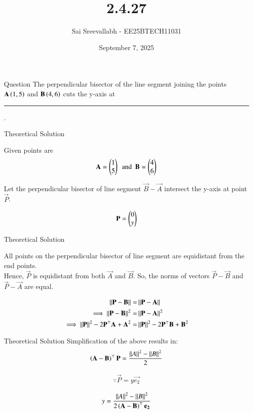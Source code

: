 \documentclass{beamer}
\title 
{2.4.27}
\date{September 7, 2025}
\author 
{Sai Sreevallabh - EE25BTECH11031}
\begin{document}
\frame{\titlepage}
\begin{frame}{Question}
The perpendicular bisector of the line segment joining the points $\mathbf{A}\left(1,5\right)$ and $\mathbf{B}\left(4,6\right)$ cuts the y-axis at \rule{1.5cm}{0.4pt}.
\end{frame}



\begin{frame}{Theoretical Solution}

Given points are\\

\begin{align}
    \mathbf{A}= \begin{pmatrix}1\\5\end{pmatrix} \ \ \text{and}\ \ \mathbf{B} = \begin{pmatrix}4\\6\end{pmatrix}
\end{align}

Let the perpendicular bisector of line segment $\vec{B}-\vec{A}$ intersect the y-axis at point $\vec{P}$. 

\begin{align}
    \mathbf{P} = \begin{pmatrix}0\\y\end{pmatrix}
\end{align}

\end{frame}

\begin{frame}{Theoretical Solution}

All points on the perpendicular bisector of line segment are equidistant from the end points. \\
Hence, $\vec{P}$ is equidistant from both $\vec{A}$ and $\vec{B}$. So, the norms of vectors $\vec{P}-\vec{B}$ and $\vec{P}-\vec{A}$ are equal. 

\begin{align}
    \left\lVert\mathbf{P}-\mathbf{B}\right\rVert =& \left\lVert\mathbf{P}-\mathbf{A}\right\rVert\\
    \implies  \left\lVert\mathbf{P}-\mathbf{B}\right\rVert^2 =& \left\lVert\mathbf{P}-\mathbf{A}\right\rVert^2\\
    \implies \left\lVert\mathbf{P}\right\rVert^2 - 2\mathbf{P}^\top\mathbf{A} + \mathbf{A}^2 =& \left\lVert\mathbf{P}\right\rVert^2 - 2\mathbf{P}^\top\mathbf{B} + \mathbf{B}^2
\end{align}

\end{frame}

\begin{frame}{Theoretical Solution}
Simplification of the above results in:
\begin{align}
    \left(\mathbf{A}-\mathbf{B}\right)^\top\mathbf{P} = \frac{\left\lVert A\right\rVert^2 - \left\lVert B\right\rVert^2}{2} 
\end{align}

\begin{align}
    \because \vec{P} = y\vec{e_2}   
\end{align}

\begin{align}
    y = \frac{\left\lVert A\right\rVert^2-\left\lVert B\right\rVert^2}{2\left(\mathbf{A}-\mathbf{B}\right)^\top\mathbf{e_2}}
\end{align}
\end{frame}
\end{document}
